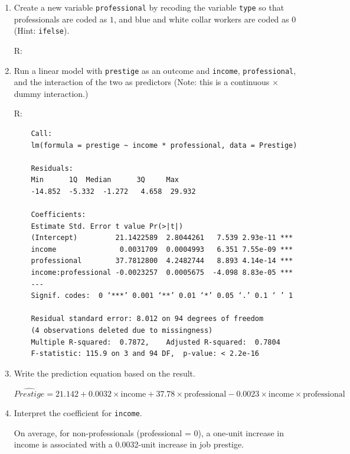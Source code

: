 \documentclass[12pt,letterpaper]{article}
\begin{document}
\newpage
\begin{enumerate}
	
	\item [(a)]
	Create a new variable \texttt{professional} by recoding the variable \texttt{type} so that professionals are coded as $1$, and blue and white collar workers are coded as $0$ (Hint: \texttt{ifelse}).
	
	R:
	
	
	
	\item [(b)]
	Run a linear model with \texttt{prestige} as an outcome and \texttt{income}, \texttt{professional}, and the interaction of the two as predictors (Note: this is a continuous $\times$ dummy interaction.)
	
	R:
	
	
	\begin{verbatim}
	Call:
	lm(formula = prestige ~ income * professional, data = Prestige)
	
	Residuals:
	Min      1Q  Median      3Q     Max 
	-14.852  -5.332  -1.272   4.658  29.932 
	
	Coefficients:
	Estimate Std. Error t value Pr(>|t|)    
	(Intercept)         21.1422589  2.8044261   7.539 2.93e-11 ***
	income               0.0031709  0.0004993   6.351 7.55e-09 ***
	professional        37.7812800  4.2482744   8.893 4.14e-14 ***
	income:professional -0.0023257  0.0005675  -4.098 8.83e-05 ***
	---
	Signif. codes:  0 ‘***’ 0.001 ‘**’ 0.01 ‘*’ 0.05 ‘.’ 0.1 ‘ ’ 1
	
	Residual standard error: 8.012 on 94 degrees of freedom
	(4 observations deleted due to missingness)
	Multiple R-squared:  0.7872,	Adjusted R-squared:  0.7804 
	F-statistic: 115.9 on 3 and 94 DF,  p-value: < 2.2e-16
	\end{verbatim}
	\vspace{1cm}
	
	\item [(c)]
	Write the prediction equation based on the result.
	
	$\widehat{Prestige}=21.142+0.0032\times\text{income}+37.78\times\text{professional}-0.0023\times\text{income}\times\text{professional}$
	\vspace{1cm}

	\item [(d)]
	Interpret the coefficient for \texttt{income}.
	
	On average, for non-professionals (professional = 0), a one-unit increase in income is associated with a 0.0032-unit increase in job prestige.
	\vspace{1cm}	
	

\end{enumerate}
\end{document}
